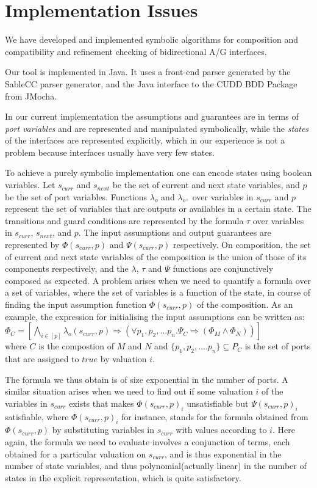 \section{Implementation Issues}

We have developed and implemented symbolic algorithms for composition and 
compatibility and refinement checking of bidirectional A/G interfaces.

Our tool is implemented in Java. It uses a front-end parser generated by 
the SableCC parser generator, and the Java interface to the CUDD BDD Package
from JMocha.

In our current implementation the assumptions and guarantees are in terms of 
{\em port variables} and are represented and manipulated symbolically, 
while the {\em states} of the interfaces are represented explicitly, which
in our experience is not a problem because interfaces usually have very few 
states. 

To achieve a purely symbolic implementation one can encode states using 
boolean variables. Let $s_{curr}$ and $s_{next}$ be the set of current and
next state variables, and $p$ be the set of port variables. Functions 
$\lambda_{o}$ and $\lambda_{o^+}$ over variables in $s_{curr}$ and $p$ 
represent the set of variables that are outputs or availables in a certain
state. The transitions and guard conditions are represented by the formula
$\tau$ over variables in $s_{curr}$, $s_{next}$, and $p$. The input assumptions
and output guarantees are represented by $\Phi(s_{curr},p)$ and 
$\Psi(s_{curr},p)$ respectively. On composition, the set of current and next 
state variables of the composition is the union of those of its components
respectively, and the $\lambda$, $\tau$ and $\Psi$ functions are 
conjunctively composed as expected. A problem arises when we need to 
quantify a formula over a set of variables, where the set of variables 
is a function of the state, in course of finding the input assumption 
function $\Phi(s_{curr},p)$ of the composition. As an example, the 
expression for initialising the input assumptions can be written as: \\
$\Phi_C = [\bigwedge_{i \in [p]} \lambda_o(s_{curr},p) \Rightarrow 
(\forall p_1,p_2,...p_n. \Psi_C \Rightarrow (\Phi_M \land \Phi_N))]$ \\
where $C$ is the compostion of $M$ and $N$ and $\{p_1,p_2,....p_n\} \subseteq P_C$
is the set of ports that are assigned to $true$ by valuation $i$.

The formula we thus obtain is of size exponential in the number of ports. A 
similar situation arises when we need to find out if some valuation $i$
of the variables in $s_{curr}$ exists that makes $\Phi(s_{curr},p)_i$ 
unsatisfiable but $\Psi(s_{curr},p)_i$ satisfiable, where 
$\Phi(s_{curr},p)_i$ for instance, stands for the formula obtained from
$\Phi(s_{curr},p)$ by substituting variables in $s_{curr}$ with values 
according to $i$. Here again, the formula we need to evaluate involves 
a conjunction of terms, each obtained for a particular valuation on 
$s_{curr}$, and is thus exponential in the number of state variables, 
and thus polynomial(actually linear) in the number of states in the 
explicit representation, which is quite satisfactory.



